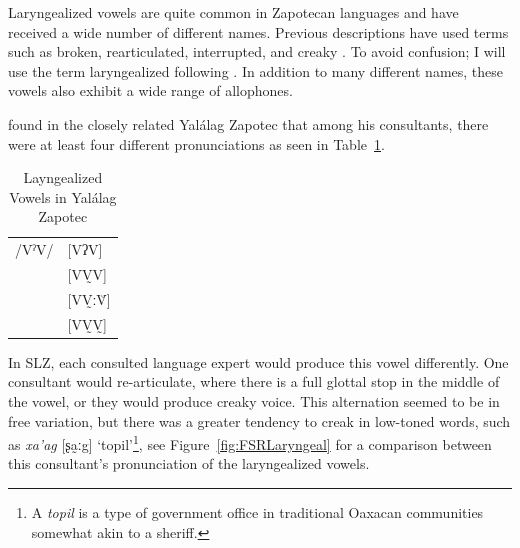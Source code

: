 \documentclass[12pt, letterpaper]{article}
\providecommand{\lsptoprule}{\midrule\toprule}
\providecommand{\lspbottomrule}{\bottomrule\midrule}
\begin{document}
Laryngealized vowels are quite common in Zapotecan languages and have received a wide number of different names. Previous descriptions have used terms such as broken, rearticulated, interrupted, and creaky \citep{longDiccionarioZapotecoSan2005,avelinobecerraTopicsYalalagZapotec2004,avelinoAcousticElectroglottographicAnalyses2010,sonnenscheinDescriptiveGrammarSan2005,adlerAcousticsPhonationTypes2016}. To avoid confusion; I will use the term laryngealized following \citet{avelinoAcousticElectroglottographicAnalyses2010}. In addition to many different names, these vowels also exhibit a wide range of allophones. 

\citet{avelinoAcousticElectroglottographicAnalyses2010} found in the closely related Yalálag Zapotec that among his consultants, there were at least four different pronunciations as seen in Table~\ref{tab:laryngeal}. 
\begin{table}[!h]
	\centering
	\caption{Layngealized Vowels in Yalálag Zapotec}
	\label{tab:laryngeal}
	 \begin{tabular}{ll}
	\lsptoprule
	/VˀV/	&  [VʔV]  \\
			&  [VV̰V]   \\
			&  [VV̰ːV̆]  \\
			&  [VV̰V̰]	\\
	\lspbottomrule
	\end{tabular}
\end{table}
In SLZ, each consulted language expert would produce this vowel differently. One consultant would re-articulate, where there is a full glottal stop in the middle of the vowel, or they would produce creaky voice. This alternation seemed to be in free variation, but there was a greater tendency to creak in low-toned words, such as \textit{xa'ag} [ʂa̰ːg] `topil'\footnote{A \textit{topil} is a type of government office in traditional Oaxacan communities somewhat akin to a sheriff.}, see Figure~\ref{fig:FSRLaryngeal} for a comparison between this consultant's pronunciation of the laryngealized vowels.
\end{document}
